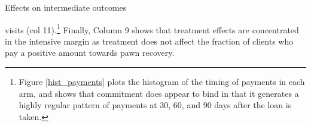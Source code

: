 \documentclass[ecta,nameyear,final]{econsocart}
\begin{document}
\begin{landscape}
\begin{table}
\caption{Effects on intermediate outcomes}
\label{mechanisms}
\begin{center}
\resizebox{1.30\textwidth}{!}{
\scriptsize{}
}
\end{center}
\end{table}

\end{landscape}

\noindent visits (col 11).\footnote{Figure \ref{hist_payments} plots the histogram of the timing of payments in each arm, and shows that commitment does appear to bind in that it generates a highly regular pattern of payments at 30, 60, and 90 days after the loan is taken.} Finally, Column 9 shows that treatment effects are concentrated in the intensive margin as treatment does not affect the fraction of clients who pay a positive amount towards pawn recovery.
\end{document}
